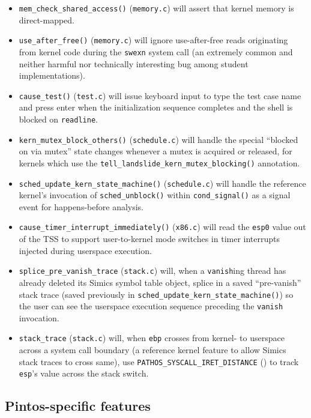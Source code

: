 \begin{itemize}
	\item {\tt mem\_check\_shared\_access()} ({\tt memory.c})
		will assert that kernel memory is direct-mapped.
	\item {\tt use\_after\_free()} ({\tt memory.c})
		will ignore use-after-free reads originating from kernel code during the {\tt swexn} system call
		(an extremely common and neither harmful nor technically interesting bug among student implementations).
	\item {\tt cause\_test()} ({\tt test.c})
		will issue keyboard input to type the test case name and press enter
		when the initialization sequence completes and the shell is blocked on {\tt readline}.
	\item {\tt kern\_mutex\_block\_others()} ({\tt schedule.c})
		will handle the special ``blocked on via mutex'' state changes
		whenever a mutex is acquired or released,
		for kernels which use the {\tt tell\_landslide\_kern\_mutex\_blocking()} annotation.
	\item {\tt sched\_update\_kern\_state\_machine()} ({\tt schedule.c})
		will handle the reference kernel's invocation of {\tt sched\_unblock()} within {\tt cond\_\allowbreak{}signal()}
		as a signal event for happens-before analysis.
	\item {\tt cause\_timer\_interrupt\_immediately()} ({\tt x86.c})
		will read the {\tt esp0} value out of the TSS to support user-to-kernel mode switches
		in timer interrupts injected during userspace execution.
	\item {\tt splice\_pre\_vanish\_trace} ({\tt stack.c})
		will, when a {\tt vanish}ing thread has already deleted its Simics symbol table object,
		splice in a saved ``pre-vanish'' stack trace
		(saved previously in {\tt sched\_update\_kern\_state\_machine()})
		so the user can see the userspace execution sequence preceding the {\tt vanish} invocation.
	\item {\tt stack\_trace} ({\tt stack.c})
		will, when {\tt ebp} crosses from kernel- to userspace across a system call boundary
		(a reference kernel feature to allow Simics stack traces to cross same),
		use {\tt PATHOS\_SYSCALL\_IRET\_DISTANCE} (\sect{\ref{sec:landslide-config-landslide}})
		to track {\tt esp}'s value across the stack switch.
\end{itemize}


\subsection{Pintos-specific features}
\label{sec:landlside-pintosspecifics}


